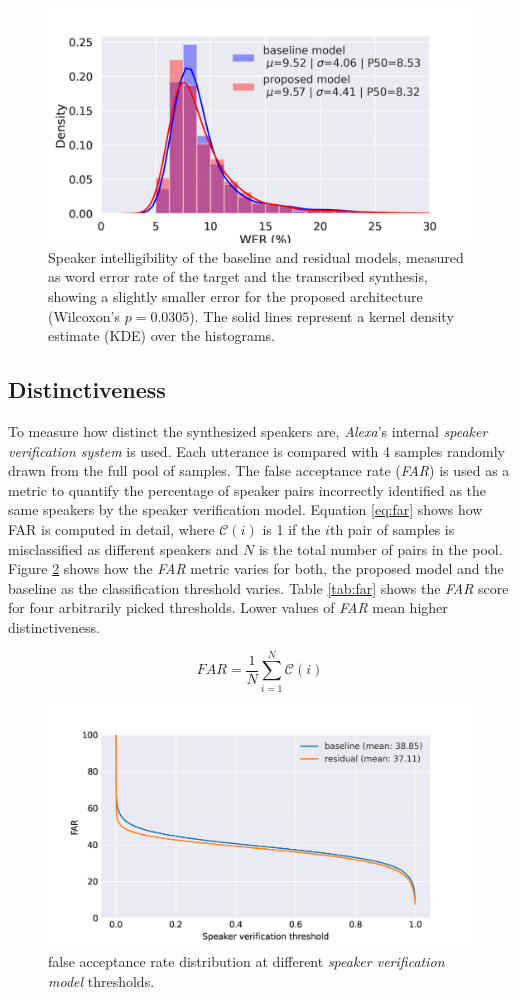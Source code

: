 \begin{figure}[h]
	\centering
	\includegraphics[width=0.7\linewidth]{tts/images/wer}
	\caption{Speaker intelligibility of the baseline and residual models, measured as word error rate of the target and the transcribed synthesis, showing a slightly smaller error for the proposed architecture (Wilcoxon's $p=0.0305$). The solid lines represent a kernel density estimate (KDE) over the histograms.}
	\label{fig:wer}
\end{figure}


\subsection{Distinctiveness}
To measure how distinct the synthesized speakers are, \textit{Alexa}'s internal \textit{speaker verification system} is used.  Each utterance is compared with 4 samples randomly drawn from the full pool of samples. The false acceptance rate (\textit{FAR}) is used as a metric to quantify the percentage of speaker pairs incorrectly identified as the same speakers by the speaker verification model. Equation \ref{eq:far} shows how FAR is computed in detail, where $\mathcal{C}(i)$ is 1 if the $i$th pair of samples is misclassified as different speakers and $N$ is the total number of pairs in the pool. Figure \ref{fig:far} shows how the \textit{FAR} metric varies for both, the proposed model and the baseline as the classification threshold varies. Table \ref{tab:far} shows the \textit{FAR} score for four arbitrarily picked thresholds. Lower values of \textit{FAR} mean higher distinctiveness.

\begin{equation}
    FAR = \frac{1}{N}\sum_{i=1}^{N} \mathcal{C}(i)
    \label{eq:far}
\end{equation}


\begin{figure}[h]
	\centering
	\includegraphics[width=.7\linewidth]{tts/images/far}
	\caption{false acceptance rate distribution at different \textit{speaker verification model} thresholds.}
	\label{fig:far}
\end{figure}

